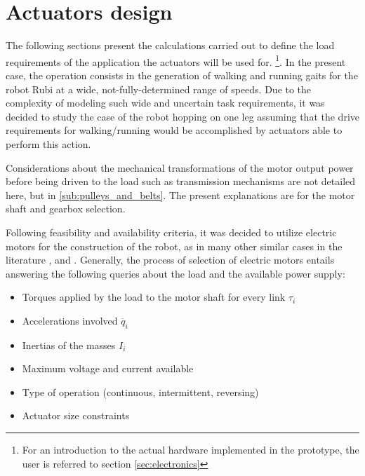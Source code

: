 
\section{Actuators design}
\label{sec_actuators}
The following sections present the calculations carried out to define the load requirements of the application the actuators will be used for.
\footnote{For an introduction to the actual hardware implemented in the prototype, the user is referred to section \ref{sec:electronics}}.
In the present case, the operation consists in the generation of walking and running gaits for the robot Rubi at a wide, not-fully-determined range of speeds. 
Due to the complexity of modeling such wide and uncertain task requirements, it was decided to study the case of the robot hopping on one leg assuming that the drive requirements for walking/running would be accomplished by actuators able to perform this action.

Considerations about the mechanical transformations of the motor output power before being driven to the load such as transmission mechanisms are not detailed here, but in \ref{sub:pulleys_and_belts}.
The present explanations are for the motor shaft and gearbox selection.

Following feasibility and availability criteria, it was decided to utilize electric motors for the construction of the robot, as in many other similar cases in the literature \cite{runbot1}, \cite{phides} and \cite{biobiped}.
Generally, the process of selection of electric motors entails answering the following queries about the load and the available power supply:

\begin{itemize}
\label{list:motor_selection}
	\item Torques applied by the load to the motor shaft for every link $\tau_{i}$
	\item Accelerations involved $\ddot{q_{i}}$
	\item Inertias of the masses $I_{i}$
	\item Maximum voltage and current available 
	\item Type of operation (continuous, intermittent, reversing)
	\item Actuator size constraints
\end{itemize}

